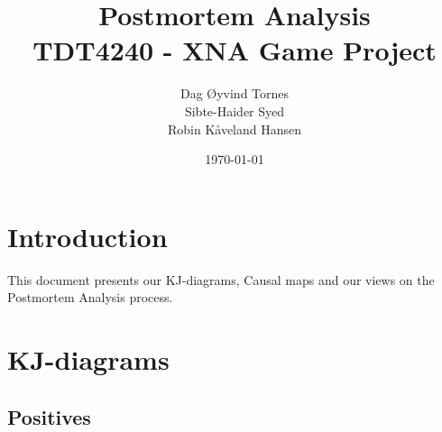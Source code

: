 \documentclass[titlepage,a4paper,11pt]{article}
\date{\today}
\begin{document}
\title{Postmortem Analysis\\
 		TDT4240 - XNA Game Project}

\author{Dag Øyvind Tornes\\
 		Sibte-Haider Syed\\ 
		Robin Kåveland Hansen\\}
\maketitle

\pagestyle{empty}
\tableofcontents
\clearpage
\pagestyle{plain}

\section{Introduction}
This document presents our KJ-diagrams, Causal maps and our views
on the Postmortem Analysis process.

\section{KJ-diagrams}

\subsection{Positives}
\end{document}
